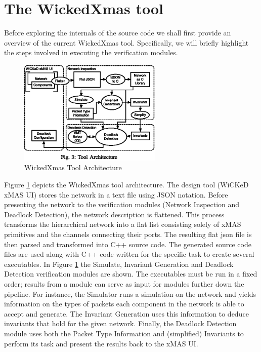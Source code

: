\documentclass[a4paper,11pt]{article}
\begin{document}
\tableofcontents

\pagebreak

\section{The WickedXmas tool}


Before exploring the internals of the source code we shall first provide an overview
of the current WickedXmas tool. Specifically, we will briefly highlight the steps involved in
executing the verification modules.

\begin{figure}[h]
  \includegraphics[height=5cm]{wickedxmas-arch.eps}
  \caption{WickedXmas Tool Architecture}
  \label{fig:wickedxmas-arch}
\end{figure}

Figure \ref{fig:wickedxmas-arch}\cite[p.~3]{13_toolxmas} depicts the WickedXmas tool architecture.
The design tool (WiCKeD xMAS UI) stores the network in a text file using JSON notation. Before
presenting the network to the verification modules (Network Inspection and Deadlock Detection),
the network description is flattened. This process transforms the hierarchical network into
a flat list consisting solely of xMAS primitives and the channels connecting their ports. The resulting
flat json file is then parsed and transformed into C++ source code. The generated source code files are
used along with C++ code written for the specific task to create several executables. In Figure
\ref{fig:wickedxmas-arch} the Simulate, Invariant Generation and Deadlock Detection verification modules
are shown. The executables must be run in a fixed order; results from a module can serve as input for modules further down
the pipeline. For instance, the Simulator runs a simulation on the network and yields information on the
types of packets each component in the network is able to accept and generate. The Invariant Generation
uses this information to deduce invariants that hold for the given network. Finally, the Deadlock Detection
module uses both the Packet Type Information and (simplified) Invariants to perform its task and present
the results back to the xMAS UI.
\end{document}
